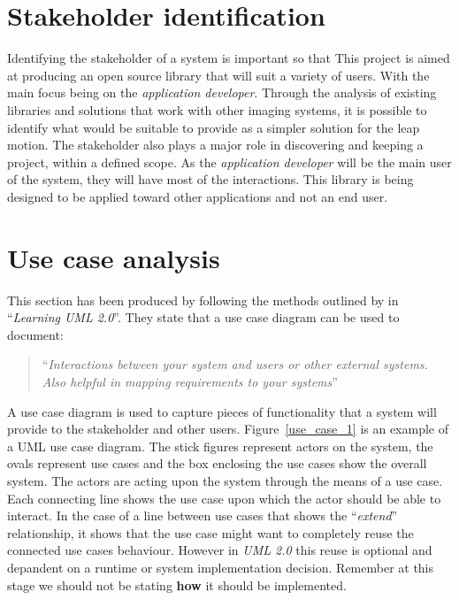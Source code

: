 \documentclass[11pt,oneside]{report}
\begin{document}
		\section{Stakeholder identification}
			Identifying the stakeholder of a system is important so that 
			This project is aimed at producing an open source library that will suit a variety of users.
			With the main focus being on the \textit{application developer}.
			Through the analysis of existing libraries and solutions that work with other imaging systems, it is possible to identify what would be suitable to provide as a simpler solution for the leap motion.
			The stakeholder also plays a major role in discovering and keeping a project, within a defined scope.
			As the \textit{application developer} will be the main user of the system, they will	have most of the interactions.
			This library is being designed to be applied toward other applications and not an end user.	
		\section{Use case analysis}
			This section has been produced by following the methods outlined by  in ``\textit{Learning UML 2.0}''.
			They state that a use case diagram can be used to document:
			\begin{quote}
				``\textit{Interactions between your system and users or other external systems. Also helpful in mapping requirements to your systems}''
			\end{quote}
			A use case diagram is used to capture pieces of functionality that a system will provide to the stakeholder and other users.
			Figure~\ref{use_case_1} is an example of a UML use case diagram.
			The stick figures represent actors on the system, the ovals represent use cases and the box enclosing the use cases show the overall system. 
			The actors are acting upon the system through the means of a use case.
			Each connecting line shows the use case upon which the actor should be able to interact.
			In the case of a line between use cases that shows the ``\textit{extend}'' relationship, it shows that the use case might want to completely reuse the connected use cases behaviour.
			However in \textit{UML 2.0} this reuse is optional and depandent on a runtime or system implementation decision.
			Remember at this stage we should not be stating \textbf{how} it should be implemented.
		
\end{document}
